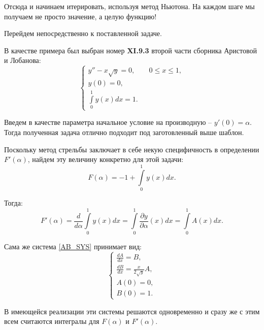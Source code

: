 		Отсюда и начинаем итерировать, используя метод Ньютона. На каждом шаге мы получаем не просто значение, а целую функцию!
		
		Перейдем непосредственно к поставленной задаче.

		
		В качестве примера был выбран номер \textbf{XI.9.3} второй части сборника Аристовой и Лобанова:
		\begin{equation*}
			\begin{cases*}
				y'' - x\sqrt{y} = 0, \;\;\;\;\;\;\; 0 \leqslant x \leqslant 1, \\
				y(0) = 0, \\
				\displaystyle\int\limits_{0}^{1} y(x)dx = 1.
			\end{cases*}
		\end{equation*}
	
		Введем в качестве параметра начальное условие на производную -- $y'(0) = \alpha$. Тогда полученная задача отлично подходит под заготовленный выше шаблон.
	
		Поскольку метод стрельбы заключает в себе некую специфичность в определении $F'(\alpha)$, найдем эту величину конкретно для этой задачи:
		\begin{equation*}
			F(\alpha) = -1 + \displaystyle\int\limits_{0}^{1} y(x)dx.
		\end{equation*}
	
		Тогда:
		\begin{equation*}
			F'(\alpha) = \frac{d}{d\alpha}\displaystyle\int\limits_{0}^{1} y(x)dx = \displaystyle\int\limits_{0}^{1} \frac{\partial y}{\partial \alpha}(x) dx = \displaystyle\int\limits_{0}^{1} A(x) dx.
		\end{equation*}
	
		Сама же система \eqref{AB_SYS} принимает вид:
		\begin{equation*}
			\begin{cases}
				\frac{dA}{dx} = B, \\
				\frac{dB}{dx} = \frac{x}{2\sqrt{y}} A, \\
				A(0) = 0, \\
				B(0) = 1.
			\end{cases}
		\end{equation*}
	
		В имеющейся реализации эти системы решаются одновременно и сразу же с этим всем считаются интегралы для $F(\alpha)$ и $F'(\alpha)$.
	
	
		\newpage

